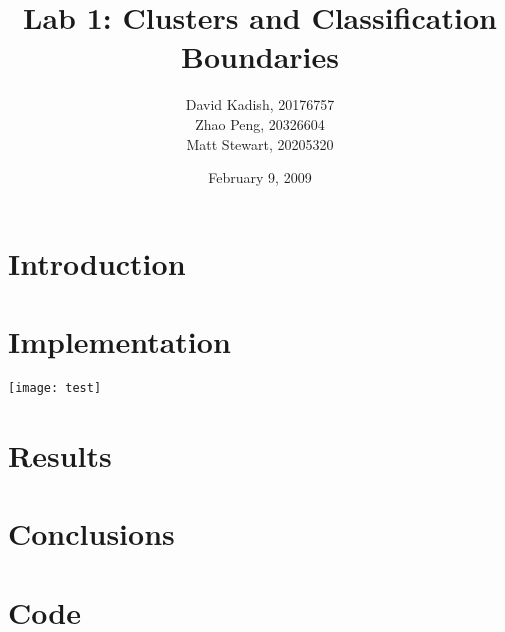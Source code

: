 \documentclass{sydeStyle}
\title{Lab 1: Clusters and Classification Boundaries}
\author{
    David Kadish, 20176757\\
    Zhao Peng, 20326604\\
    Matt Stewart, 20205320\\
}
\date{February 9, 2009}
\numberwithin{algorithm}{chapter}
\begin{document}

\maketitle

\setcounter{page}{2} %


\chapter{Introduction}


\chapter{Implementation}

\texttt{[image: test]}

\chapter{Results}
\label{cha:results}


\chapter{Conclusions}


\appendix
\renewcommand{\thechapter}{\Alph{chapter}}

\chapter{Code}

\end{document}
